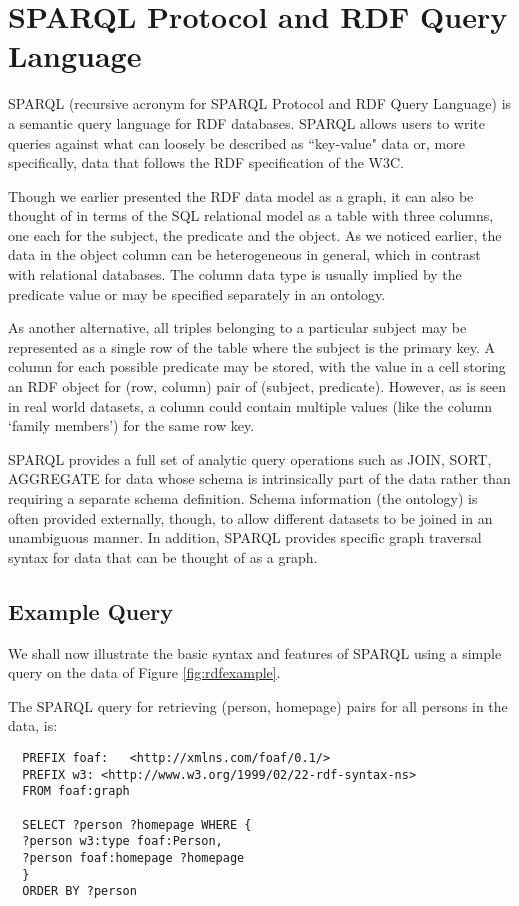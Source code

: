 \section[SPARQL]{SPARQL Protocol and RDF Query Language}

SPARQL\cite{prud2008sparql} (recursive acronym for SPARQL Protocol and RDF Query Language) is a semantic query language for RDF databases. SPARQL allows users to write queries against what can loosely be described as ``key-value" data or, more specifically, data that follows the RDF specification of the W3C. 

Though we earlier presented the RDF data model as a graph, it can also be thought of in terms of the SQL relational model as a table with three columns, one each for the subject, the predicate and the object. As we noticed earlier, the data in the object column can be heterogeneous in general, which in contrast with relational databases. The column data type is usually implied by the predicate value or may be specified separately in an ontology. 

As another alternative, all triples belonging to a particular subject may be represented as a single row of the table where the subject is the primary key. A column for each possible predicate may be stored, with the value in a cell storing an RDF object for (row, column) pair of (subject, predicate). However, as is seen in real world datasets, a column could contain multiple values (like the column `family members') for the same row key.

SPARQL provides a full set of analytic query operations such as JOIN, SORT, AGGREGATE for data whose schema is intrinsically part of the data rather than requiring a separate schema definition. Schema information (the ontology) is often provided externally, though, to allow different datasets to be joined in an unambiguous manner. In addition, SPARQL provides specific graph traversal syntax for data that can be thought of as a graph.

\subsection{Example Query}

We shall now illustrate the basic syntax and features of SPARQL using a simple query on the data of Figure \ref{fig:rdfexample}. 

The SPARQL query for retrieving (person, homepage) pairs for all persons in the data, is:
\begin{verbatim}
  PREFIX foaf:   <http://xmlns.com/foaf/0.1/>
  PREFIX w3: <http://www.w3.org/1999/02/22-rdf-syntax-ns>
  FROM foaf:graph
  
  SELECT ?person ?homepage WHERE {
  ?person w3:type foaf:Person,
  ?person foaf:homepage ?homepage
  }
  ORDER BY ?person
\end{verbatim}

